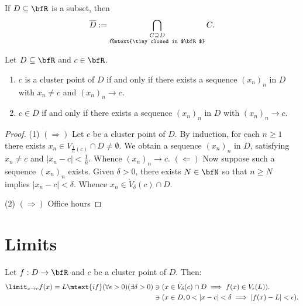     \begin{definition}
        If $D \subseteq \bfR$ is a subset, then
            \begin{equation*}
            \begin{split}
                \overline{D}:=\bigcap_{\substack{C \supseteq D \\ C\hspace{-4pt}\mtext{\tiny closed in $\bfR$}}}C.
            \end{split}
            \end{equation*}
    \end{definition}

    \begin{proposition}
        Let $D \subseteq \bfR$ and $c \in \bfR$.
            \begin{enumerate}[label = (\arabic*)]
                \item $c$ is a cluster point of $D$ if and only if there exists a sequence $(x_n)_n$ in $D$ with $x_n \neq c$ and $(x_n)_n \rightarrow c$.
                \item $c \in \overline{D}$ if and only if there exists a sequence $(x_n)_n$ in $D$ with $(x_n)_n \rightarrow c$.
            \end{enumerate}
    \end{proposition}
        \begin{proof}
            (1) $(\Rightarrow)$ Let $c$ be a cluster point of $D$. By induction, for each $n \geq 1$ there exists $x_n \in V_{\frac{1}{n}(c)}\cap D \neq \emptyset$. We obtain a sequence $(x_n)_n$ in $D$, satisfying $x_n \neq c$ and $|x_n - c| < \frac{1}{n}$. Whence $(x_n)_n \rightarrow c$. $(\Leftarrow)$ Now suppose such a sequence $(x_n)_n$ exists. Given $\delta > 0$, there exists $N \in \bfN$ so that $n \geq N$ implies $|x_n - c| < \delta$. Whence $x_n \in \dot{V}_\delta(c) \cap D$. \nl

             (2) $(\Rightarrow)$ {\color{red} Office hours}
        \end{proof}

\section{Limits}
    \begin{definition}
        Let $f:D \rightarrow \bfR$ and $c$ be a cluster point of $D$. Then:
            \begin{equation*}
            \begin{split}
                \limit_{x \rightarrow c}f(x) = L \mtext{if} (\forall \epsilon > 0)(\exists \delta  > 0)&\ni (x \in \dot{V}_\delta(c) \cap D \implies f(x) \in V_\epsilon(L)).\\
                &\ni (x \in D, 0 < |x-c| < \delta \implies |f(x)-L| < \epsilon).
            \end{split}
            \end{equation*}
    \end{definition}

